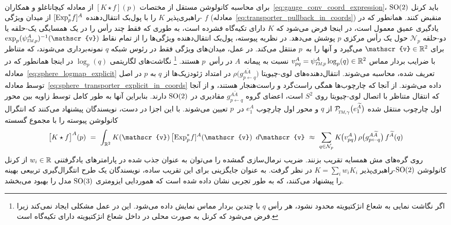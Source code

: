 برای محاسبه کانولوشن مستقل از مختصات $[K \star f](p)$ از معادله کیچاناغلو و همکاران~\eqref{eq:gauge_conv_coord_expression}، \cite{kicanaoglu2019gaugeSphere} باید کرنل $\operatorname{SO}(2)$-راهبری‌پذیر $K$ را با پول‌بک انتقال‌دهنده $[\operatorname{Exp}^*_p\mkern-2mu f]^A$ از میدان ویژگی $f$ (معادله~\eqref{eq:transporter_pullback_in_coords}) منقبض کنند.
همانطور که در یادگیری عمیق معمول است، در اینجا فرض می‌شود که $K$ دارای تکیه‌گاه فشرده است، به طوری که فقط چند رأس را در یک همسایگی یک-حلقه یا دو-حلقه $\mathcal{N}_p$ حول یک رأس مرکزی $p$ پوشش می‌دهد.
در نظریه پیوسته، پول‌بک انتقال‌دهنده ویژگی‌ها را از تمام نقاط $\exp_p (\psiTMp^A)^{-1}(\mathscr{v})$ برای $\mathscr{v} \in \R^2$ می‌گیرد و آنها را به~$p$ منتقل می‌کند.
در عمل، میدان‌های ویژگی فقط در رئوس شبکه $q$ نمونه‌برداری می‌شوند، که متناظر با ضرایب بردار مماس $v^A_{pq} = \psiTMp^A \log_p(q) \in \R^2$ نسبت به پیمانه~$A$ در رأس~$p$ هستند.%
\footnote{
	اگر نگاشت نمایی به شعاع انژکتیویته محدود نشود، هر رأس $q$ با چندین بردار مماس نمایش داده می‌شود.
	این در عمل مشکلی ایجاد نمی‌کند زیرا فرض می‌شود که کرنل به صورت محلی در داخل شعاع انژکتیویته دارای تکیه‌گاه است.
}
نگاشت‌های لگاریتمی $\log_p(q)$ در اینجا همانطور که در معادله~\eqref{eq:sphere_logmap_explicit} تعریف شده، محاسبه می‌شوند.
انتقال‌دهنده‌های لوی-چیویتا $\rho\big( g_{p\leftarrow q}^{A\widetilde{A}}\big)$ در امتداد ژئودزیک‌ها از $q$ به $p$ در اصل توسط معادله~\eqref{eq:sphere_transporter_explicit_in_coords} داده می‌شوند.
از آنجا که چارچوب‌ها همگی راست‌گرد و راست‌هنجار هستند، و از آنجا که انتقال متناظر با اتصال لوی-چیویتا روی $S^2$ است، اعضای گروه $g_{p\leftarrow q}^{A\widetilde{A}}$ مقادیری در $\operatorname{SO}(2)$ دارند.
بنابراین آنها به طور کامل توسط زاویه بین محور اول چارچوب منتقل شده $\PTMgamma\big(e_1^{\widetilde{A}}\big)$ از $q$ و محور اول چارچوب $e_1^A$ در~$p$ تعیین می‌شوند.
با این اجزا در دست، نویسندگان پیشنهاد می‌کنند که انتگرال کانولوشن پیوسته را با مجموع گسسته
\begin{align}
	\big[K\star f\big]^A(p)
	\ =\ \int_{\R^2} K(\mathscr{v})\, \big[\!\Expspf]^A(\mathscr{v}) \,\ d\mathscr{v}
	\ \approx\ \sum_{q\in\mathcal{N}_p} K\mkern-1.5mu\big(v^A_{pq}\big)\, \rho\big( g^{A\widetilde{A}}_{p\leftarrow q} \big)\, f^{\widetilde{A}}(q)
\end{align}
روی گره‌های مش همسایه تقریب بزنند.
ضریب نرمال‌سازی گمشده را می‌توان به عنوان جذب شده در پارامترهای یادگرفتنی $w_i \in\mathbb{R}$ از کرنل کانولوشن $\operatorname{SO}(2)$-راهبری‌پذیر $K = \sum_i w_i K_i$ در نظر گرفت.
به عنوان جایگزینی برای این تقریب ساده، نویسندگان یک طرح انتگرال‌گیری تربیعی بهینه را پیشنهاد می‌کنند، که به طور تجربی نشان داده شده است که هموردایی ایزومتری $\operatorname{SO}(3)$ مدل را بهبود می‌بخشد.



